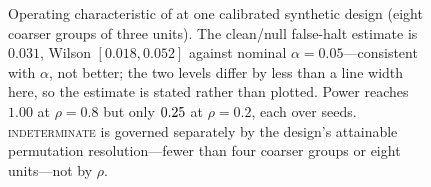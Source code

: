 \begin{figure}[!t]
{}
\caption{Operating characteristic of  at one calibrated synthetic design (eight
coarser groups of three units). The clean/null false-halt estimate is $0.031$, Wilson
$[0.018,0.052]$ against nominal $\alpha=0.05$---consistent with $\alpha$, not better; the two levels
differ by less than a line width here, so the estimate is stated rather than plotted. Power reaches
$1.00$ at $\rho=0.8$ but only $\artv{l47_power_02}{0.25}$ at $\rho=0.2$, each over
 seeds. \textsc{indeterminate} is governed separately by the design's
attainable permutation resolution---fewer than four coarser groups or eight units---not by $\rho$.}
\label{fig:opcurve}
\end{figure}
